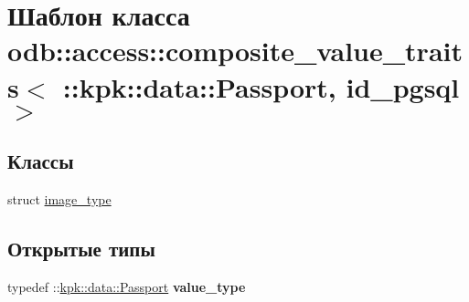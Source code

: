 \hypertarget{classodb_1_1access_1_1composite__value__traits_3_01_1_1kpk_1_1data_1_1_passport_00_01id__pgsql_01_4}{}\section{Шаблон класса odb\+:\+:access\+:\+:composite\+\_\+value\+\_\+traits$<$ \+:\+:kpk\+:\+:data\+:\+:Passport, id\+\_\+pgsql $>$}
\label{classodb_1_1access_1_1composite__value__traits_3_01_1_1kpk_1_1data_1_1_passport_00_01id__pgsql_01_4}
\subsection*{Классы}
\begin{DoxyCompactItemize}
\item 
struct \hyperlink{structodb_1_1access_1_1composite__value__traits_3_01_1_1kpk_1_1data_1_1_passport_00_01id__pgsql_01_4_1_1image__type}{image\+\_\+type}
\end{DoxyCompactItemize}
\subsection*{Открытые типы}
\begin{DoxyCompactItemize}
\item 
typedef \+::\hyperlink{classkpk_1_1data_1_1_passport}{kpk\+::data\+::\+Passport} {\bfseries value\+\_\+type}\hypertarget{classodb_1_1access_1_1composite__value__traits_3_01_1_1kpk_1_1data_1_1_passport_00_01id__pgsql_01_4_a8222453fcff145c17846c3ce8b33d2d4}{}\label{classodb_1_1access_1_1composite__value__traits_3_01_1_1kpk_1_1data_1_1_passport_00_01id__pgsql_01_4_a8222453fcff145c17846c3ce8b33d2d4}

\end{DoxyCompactItemize}
